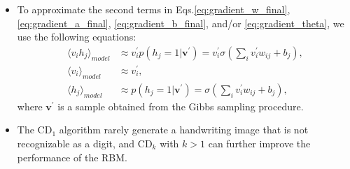 \documentclass[10pt, a4paper]{article}
\begin{document}
\begin{itemize}
    $\langle v_i \rangle_{batch}$, and replace $\sigma\left(\sum_i v_{i}w_{ij} + b_j\right)$ 
    with the average of $\langle\sigma\left(\sum_i v_{i}w_{ij} + b_j\right)\rangle_{batch}$.
  \item To approximate the second terms in Eqs.\eqref{eq:gradient_w_final},
    \eqref{eq:gradient_a_final}, \eqref{eq:gradient_b_final}, and/or \eqref{eq:gradient_theta},
    we use the following equations:
    \begin{align}
    \langle v_i h_j \rangle_{model} &\approx v_i^\prime p(h_j=1|\mathbf{v}^\prime)
        = v_i^\prime \sigma\left(\sum_i v_{i}^\prime w_{ij} + b_j\right), \nonumber \\
    \langle v_i \rangle_{model} &\approx v_i^\prime, \nonumber \\
    \langle h_j \rangle_{model} &\approx p(h_j=1|\mathbf{v}^\prime)
      = \sigma\left(\sum_i v_{i}^\prime w_{ij} + b_j\right),
     \label{eq:visible_cond_prob_final}
    \end{align}
    where $\mathbf{v}^\prime$ is a sample obtained from the Gibbs sampling procedure.
  \item The CD$_1$ algorithm rarely generate a handwriting image that is not recognizable 
    as a digit, and CD$_k$ with $k>1$ can further improve the performance of the RBM.
\end{itemize}
\end{document}
